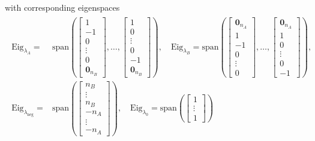 \documentclass{article}
\theoremstyle{definition}
\theoremstyle{remark}
\begin{document}
with corresponding eigenspaces
\begin{align}
	\begin{split}\label{eq:Eigenspaces}
		\text{Eig}_{\lambda_A} = &\text{span}\left(
		\begin{bmatrix}
				1      \\
				-1     \\
				0      \\
				\vdots \\
				0      \\
				\mathbf{0}_{n_B}
			\end{bmatrix},
		\dots,
		\begin{bmatrix}
				1      \\
				0      \\
				\vdots \\
				0      \\
				-1     \\
				\mathbf{0}_{n_B}
			\end{bmatrix}
		\right),
		\quad
		\text{Eig}_{\lambda_B} = \text{span}\left(
		\begin{bmatrix}
				\mathbf{0}_{n_A} \\
				1                \\
				-1               \\
				0                \\
				\vdots           \\
				0
			\end{bmatrix},
		\dots,
		\begin{bmatrix}
				\mathbf{0}_{n_{A}} \\
				1                  \\
				0                  \\
				\vdots             \\
				0                  \\
				-1
			\end{bmatrix}
		\right),  \\
		\text{Eig}_{\lambda_{\text{neg}}} = &\text{span}\left(
		\begin{bmatrix}
				n_B    \\
				\vdots \\
				n_B    \\
				-n_A   \\
				\vdots \\
				-n_A
			\end{bmatrix}
		\right), \quad
		\text{Eig}_{\lambda_0} = \text{span}\left(
		\begin{bmatrix}
				1      \\
				\vdots \\
				1
			\end{bmatrix}
		\right)
	\end{split}
\end{align}
\end{document}
